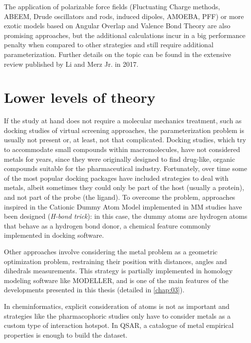 The application of polarizable force fields (Fluctuating Charge methods, ABEEM, Drude oscillators and rods, induced dipoles, AMOEBA, PFF) or more exotic models based on Angular Overlap and Valence Bond Theory are also promising approaches, but the additional calculations incur in a big performance penalty when compared to other strategies and still require additional parameterization. Further details on the topic can be found in the extensive review published by Li and Merz Jr. in 2017.\cite{li2017}

\section{Lower levels of theory}
If the study at hand does not require a molecular mechanics treatment, such as docking studies of virtual screening approaches, the parameterization problem is usually not present or, at least, not that complicated. Docking studies, which try to accommodate small compounds within macromolecules, have not considered metals for years, since they were originally designed to find drug-like, organic compounds suitable for the pharmaceutical industry. Fortunately, over time some of the most popular docking packages have included strategies to deal with metals,\cite{flexx} albeit sometimes they could only be part of the host (usually a protein), and not part of the probe (the ligand).\cite{verdonk2003improved} To overcome the problem, approaches inspired in the Cationic Dummy Atom Model implemented in MM studies have been designed (\textit{H-bond trick}): in this case, the dummy atoms are hydrogen atoms that behave as a hydrogen bond donor, a chemical feature commonly implemented in docking software.

Other approaches involve considering the metal problem as a geometric optimization problem, restraining their position with distances, angles and dihedrals measurements. This strategy is partially implemented in homology modeling software like MODELLER, \cite{Sali1993} and is one of the main features of the developments presented in this thesis (detailed in \autoref{chap:03}).

In cheminformatics, explicit consideration of atoms is not as important and strategies like the pharmacophoric studies only have to consider metals as a custom type of interaction hotspot.\cite{johns2009,kawasuji2012,carcelli2014,yang2016} In QSAR, a catalogue of metal empirical properties is enough to build the dataset.\cite{walker2012fundamental}

